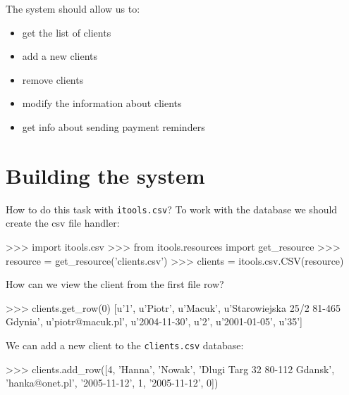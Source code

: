 \documentclass[a4paper]{book}
\begin{document}
The system should allow us to:
\begin{itemize}
    \item get the list of clients
    \item add a new clients
    \item remove clients 
    \item modify the information about clients
    \item get info about sending payment reminders 
\end{itemize}


\section{Building the system}

How to do this task with {\tt itools.csv}? To work with the
database we should create the csv file handler:
\begin{code}
    >>> import itools.csv
    >>> from itools.resources import get_resource
    >>> resource = get_resource('clients.csv')
    >>> clients = itools.csv.CSV(resource)
\end{code}

How can we view the client from the first file row?
\begin{code}
    >>> clients.get_row(0)
    [u'1', u'Piotr', u'Macuk', u'Starowiejska 25/2 81-465 Gdynia',
    u'piotr@macuk.pl', u'2004-11-30', u'2', u'2001-01-05', u'35']
\end{code}
    
We can add a new client to the {\tt clients.csv} database:
\begin{code}
    >>> clients.add_row([4, 'Hanna', 'Nowak', 'Dlugi Targ 32 80-112 Gdansk',
    'hanka@onet.pl', '2005-11-12', 1, '2005-11-12', 0])
\end{code}
\end{document}
